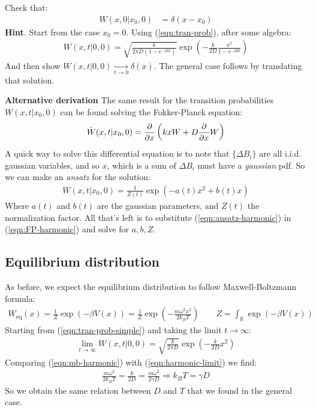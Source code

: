 \documentclass[../template.tex]{subfiles}
\begin{document}
\begin{exo}
    Check that:
    \begin{align*}
        W(x,0|x_0,0) &= \delta(x-x_0)
    \end{align*}
    \textbf{Hint}. Start from the case $x_0 = 0$. Using (\ref{eqn:tran-prob}), after some algebra:
    \begin{align}
        W(x,t|0,0) = \sqrt{\frac{k}{2 \pi D (1-e^{-2kt})} } \exp\left(-\frac{k}{2D} \frac{x^2}{1- e^{-2kt}}  \right)
        \label{eqn:tran-prob-simple}
    \end{align}
    And then show $W(x,t|0,0)  \xrightarrow[t \to 0]{} \delta(x)$. The general case follows by translating that solution. 
\end{exo}

\begin{expl}\textbf{Alternative derivation} 
    The same result for the transition probabilities $W(x,t|x_0,0)$ can be found solving the Fokker-Planck equation:
    \begin{align}
        \dot{W}(x,t|x_0,0) = \pdv{x} \left(kx W + D \pdv{x}W\right)
        \label{eqn:FP-harmonic}
    \end{align}
    A quick way to solve this differential equation is to note that $\{\Delta B_i\}$ are all i.i.d. gaussian variables, and so $x$, which is a sum of $\Delta B_i$ must have a \textit{gaussian} pdf. So we can make an \textit{ansatz} for the solution:
    \begin{align}\label{eqn:ansatz-harmonic}
        W(x,t|x_0,0) = \frac{1}{Z(t)} \exp\left({-a(t) x^2 + b(t)x}\right) 
    \end{align}  
    Where $a(t)$ and $b(t)$ are the gaussian parameters, and $Z(t)$ the normalization factor. All that's left is to substitute (\ref{eqn:ansatz-harmonic}) in (\ref{eqn:FP-harmonic}) and solve for $a,b,Z$.
\end{expl}

\subsection{Equilibrium distribution}
As before, we expect the equilibrium distribution to follow Maxwell-Boltzmann formula:
\begin{align}
    W_{\mathrm{eq} }(x) = \frac{1}{Z} \exp(-\beta V(x)) = \frac{1}{Z} \exp\left(-\frac{m \omega^2 x^2}{2 k_B T} \right) \qquad Z = \int_{\mathbb{R}} \exp(-\beta V(x))  \label{eqn:mb-harmonic}
\end{align}
Starting from (\ref{eqn:tran-prob-simple}) and taking the limit $t \to \infty$:
\begin{align}
    \lim_{t \to \infty} W(x,t|0,0) = \sqrt{\frac{k}{2 \pi D} }\exp\left(-\frac{k}{2D} x^2 \right) \label{eqn:harmonic-limit}
\end{align}
Comparing (\ref{eqn:mb-harmonic}) with (\ref{eqn:harmonic-limit}) we find:
\begin{align*}
    \frac{m \omega^2}{2 k_B T} = \frac{k}{2D} = \frac{m \omega^2}{2 \gamma D} \Rightarrow k_B T = \gamma D   
\end{align*}
So we obtain the same relation between $D$ and $T$ that we found in the general case.
\end{document}
